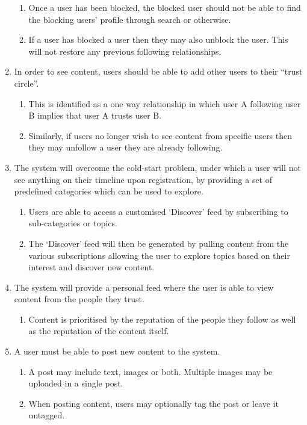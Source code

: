 \begin{enumerate}[label=\textbf{F\arabic*}]
\begin{enumerate}
			\item Once a user has been blocked, the blocked user should not be able to find the blocking users' profile through search or otherwise.
			\item If a user has blocked a user then they may also unblock the user. This will not restore any previous following relationships.
		\end{enumerate}
	\item In order to see content, users should be able to add other users to their ``trust circle''.
		\begin{enumerate}
			\item This is identified as a one way relationship in which user A following user B implies that user A trusts user B.
			\item Similarly, if users no longer wish to see content from specific users then they may unfollow a user they are already following.
		\end{enumerate}
	\item The system will overcome the cold-start problem, under which a user will not see anything on their timeline upon registration, by providing a set of predefined categories which can be used to explore.
		\begin{enumerate}
			\item Users are able to access a customised `Discover' feed by subscribing to sub-categories or topics.
			\item The `Discover' feed will then be generated by pulling content from the various subscriptions allowing the user to explore topics based on their interest and discover new content.
		\end{enumerate}
	\item The system will provide a personal feed where the user is able to view content from the people they trust.
		\begin{enumerate}
			\item Content is prioritised by the reputation of the people they follow as well as the reputation of the content itself.
		\end{enumerate}
	\item A user must be able to post new content to the system.
		\begin{enumerate}
			\item A post may include text, images or both. Multiple images may be uploaded in a single post.
			\item When posting content, users may optionally tag the post or leave it untagged.

\end{enumerate}
\end{enumerate}
